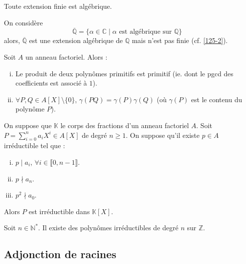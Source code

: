 	\begin{proposition}
		Toute extension finie est algébrique.
	\end{proposition}

	\begin{cexample}
		\label{125-1}
		On considère
		\[ \overline{\mathbb{Q}} = \{ \alpha \in \mathbb{C} \mid \alpha \text{ est algébrique sur } \mathbb{Q} \} \]
		alors, $\overline{\mathbb{Q}}$ est une extension algébrique de $\mathbb{Q}$ mais n'est pas finie (cf. \cref{125-2}).
	\end{cexample}


	\begin{lemma}[Gauss]
		Soit $A$ un anneau factoriel. Alors :
		\begin{enumerate}[(i)]
			\item Le produit de deux polynômes primitifs est primitif (ie. dont le pgcd des coefficients est associé à $1$).
			\item $\forall P, Q \in A[X] \setminus \{ 0 \}$, $\gamma(PQ) = \gamma(P) \gamma(Q)$ (où $\gamma(P)$ est le contenu du polynôme $P$).
		\end{enumerate}
	\end{lemma}


	\begin{theorem}
		On suppose que $\mathbb{K}$ le corps des fractions d'un anneau factoriel $A$. Soit $P = \sum_{i=0}^n a_i X^i \in A[X]$ de degré $n \geq 1$. On suppose qu'il existe $p \in A$ irréductible tel que :
		\begin{enumerate}[(i)]
			\item $p \mid a_i$, $\forall i \in \llbracket 0, n-1 \rrbracket$.
			\item $p \nmid a_n$.
			\item $p^2 \nmid a_0$.
		\end{enumerate}
		Alors $P$ est irréductible dans $\mathbb{K}[X]$.
	\end{theorem}


	\begin{application}
		\label{125-2}
		Soit $n \in \mathbb{N}^*$. Il existe des polynômes irréductibles de degré $n$ sur $\mathbb{Z}$.
	\end{application}

	\subsection{Adjonction de racines}

